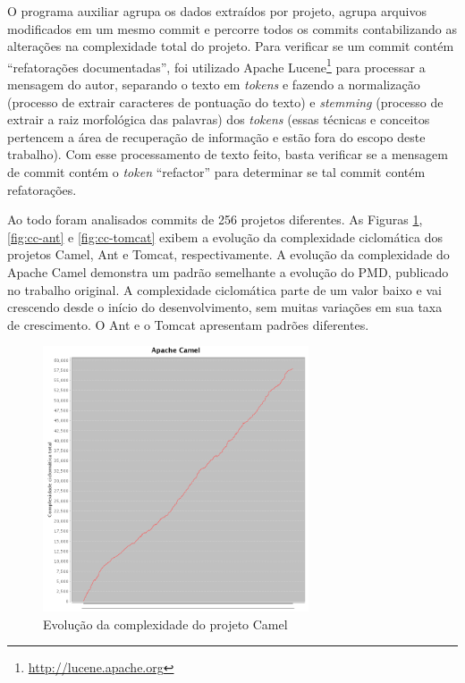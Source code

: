 \documentclass[a4paper, 12pt, twoside]{book}
\begin{document}
        O programa auxiliar agrupa os dados extraídos por projeto, agrupa arquivos modificados em um mesmo commit e percorre todos os commits contabilizando as alterações na complexidade total do projeto. Para verificar se um commit contém ``refatorações documentadas'', foi utilizado Apache Lucene\footnote{\url{http://lucene.apache.org}} para processar a mensagem do autor, separando o texto em \textit{tokens} e fazendo a normalização (processo de extrair caracteres de pontuação do texto) e \textit{stemming} (processo de extrair a raiz morfológica das palavras) dos \textit{tokens} (essas técnicas e conceitos pertencem a área de recuperação de informação e estão fora do escopo deste trabalho). Com esse processamento de texto feito, basta verificar se a mensagem de commit contém o  \textit{token} ``refactor'' para determinar se tal commit contém refatorações.

        Ao todo foram analisados commits de 256 projetos diferentes. As Figuras \ref{fig:cc-camel}, \ref{fig:cc-ant} e \ref{fig:cc-tomcat} exibem a evolução da complexidade ciclomática dos projetos Camel, Ant e Tomcat, respectivamente. A evolução da complexidade do Apache Camel demonstra um padrão semelhante a evolução do PMD, publicado no trabalho original. A complexidade ciclomática parte de um valor baixo e vai crescendo desde o início do desenvolvimento, sem muitas variações em sua taxa de crescimento. O Ant e o Tomcat apresentam padrões diferentes. 

        \begin{figure}[ht]
            \centering
            \includegraphics[width=0.7\textwidth]{img/graficos/camel.png}
            \caption{Evolução da complexidade do projeto Camel}
            \label{fig:cc-camel}
        \end{figure}
\end{document}
